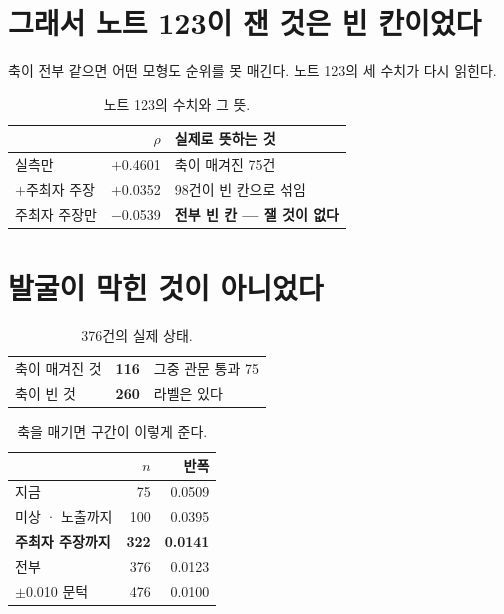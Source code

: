 \documentclass[10pt]{article}
\begin{document}

\section{그래서 노트 123이 잰 것은 빈 칸이었다}

축이 전부 같으면 어떤 모형도 순위를 못 매긴다. 노트 123의 세 수치가 다시
읽힌다.

\begin{table}[t]
\centering\tsize
\caption{노트 123의 수치와 그 뜻.}
\begin{tabular}{lrl}
\toprule
& $\rho$ & 실제로 뜻하는 것 \\
\midrule
실측만 & $+$0.4601 & 축이 매겨진 75건 \\
$+$주최자 주장 & $+$0.0352 & 98건이 빈 칸으로 섞임 \\
주최자 주장만 & $-$0.0539 & \textbf{전부 빈 칸 --- 잴 것이 없다} \\
\bottomrule
\end{tabular}
\end{table}


\section{발굴이 막힌 것이 아니었다}

\begin{table}[t]
\centering\tsize
\caption{376건의 실제 상태.}
\begin{tabular}{lrl}
\toprule
축이 매겨진 것 & \textbf{116} & 그중 관문 통과 75 \\
축이 빈 것 & \textbf{260} & 라벨은 있다 \\
\bottomrule
\end{tabular}
\end{table}

\begin{table}[t]
\centering\tsize
\caption{축을 매기면 구간이 이렇게 준다.}
\begin{tabular}{lrr}
\toprule
& $n$ & 반폭 \\
\midrule
지금 & 75 & 0.0509 \\
미상 · 노출까지 & 100 & 0.0395 \\
\textbf{주최자 주장까지} & \textbf{322} & \textbf{0.0141} \\
전부 & 376 & 0.0123 \\
\midrule
$\pm$0.010 문턱 & 476 & 0.0100 \\
\bottomrule
\end{tabular}
\end{table}
\end{document}
